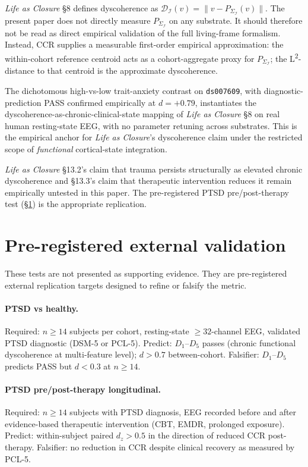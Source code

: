 \documentclass[11pt,a4paper]{article}
\begin{document}
\emph{Life as Closure} \citep{SmartLifeAsClosure} \S 8 defines dyscoherence as $\mathcal{D}_\mathcal{I}(v) = \|v - P_{\Sigma_\mathcal{I}}(v)\|$. The present paper does not directly measure $P_{\Sigma_\mathcal{I}}$ on any substrate. It should therefore not be read as direct empirical validation of the full living-frame formalism. Instead, CCR supplies a measurable first-order empirical approximation: the within-cohort reference centroid acts as a cohort-aggregate proxy for $P_{\Sigma_\mathcal{I}}$; the L\textsuperscript{2}-distance to that centroid is the approximate dyscoherence.

The dichotomous high-vs-low trait-anxiety contrast on \texttt{ds007609}, with diagnostic-prediction PASS confirmed empirically at $d = +0.79$, instantiates the dyscoherence-as-chronic-clinical-state mapping of \emph{Life as Closure} \S 8 on real human resting-state EEG, with no parameter retuning across substrates. This is the empirical anchor for \emph{Life as Closure}'s dyscoherence claim under the restricted scope of \emph{functional} cortical-state integration.

\emph{Life as Closure} \S 13.2's claim that trauma persists structurally as elevated chronic dyscoherence and \S 13.3's claim that therapeutic intervention reduces it remain empirically untested in this paper. The pre-registered PTSD pre/post-therapy test (\S\ref{sec:external}) is the appropriate replication.

\section{Pre-registered external validation}\label{sec:external}

These tests are not presented as supporting evidence. They are pre-registered external replication targets designed to refine or falsify the metric.

\paragraph{PTSD vs healthy.} Required: $n \geq 14$ subjects per cohort, resting-state $\geq 32$-channel EEG, validated PTSD diagnostic (DSM-5 or PCL-5). Predict: $D_1$--$D_5$ passes (chronic functional dyscoherence at multi-feature level); $d > 0.7$ between-cohort. Falsifier: $D_1$--$D_5$ predicts PASS but $d < 0.3$ at $n \geq 14$.

\paragraph{PTSD pre/post-therapy longitudinal.} Required: $n \geq 14$ subjects with PTSD diagnosis, EEG recorded before and after evidence-based therapeutic intervention (CBT, EMDR, prolonged exposure). Predict: within-subject paired $d_z > 0.5$ in the direction of reduced CCR post-therapy. Falsifier: no reduction in CCR despite clinical recovery as measured by PCL-5.
\end{document}
